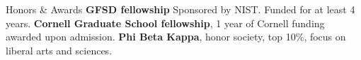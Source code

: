 \begin{rubric}{Honors \& Awards}
 \textbf{GFSD fellowship} Sponsored by NIST. Funded for at least 4 years.
\entry*[2021] \textbf{Cornell Graduate School fellowship}, 1 year of Cornell funding awarded upon admission.
\entry*[2018] \textbf{Phi Beta Kappa}, honor society, top 10\%, focus on liberal arts and sciences.
\end{rubric}